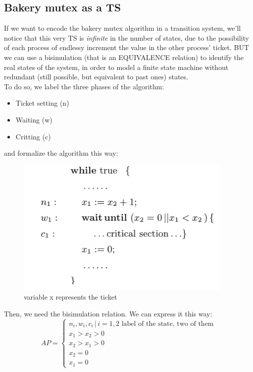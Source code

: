 \documentclass{article}
\begin{document}
			\subsection{Bakery mutex as a TS}
				If we want to encode the bakery mutex algorithm in a transition system, we'll notice that this very TS is \emph{infinite} in the number of states, due to the possibility of each process of endlessy increment the value in the other process' ticket. BUT we can use a bisimulation (that is an EQUIVALENCE relation) to identify the real states of the system, in order to model a finite state machine without redundant (still possible, but equivalent to past ones) states.\\
				To do so, we label the three phases of the algorithm:
				\begin{itemize}
					\item Ticket setting (n)
					\item Waiting (w)
					\item Critting (c)
				\end{itemize}
				and formalize the algorithm this way:
				\begin{figure}[H]
					\centering
					\includegraphics[width = \textwidth]{./images/bakery1.png}
					\caption{variable x represents the ticket}
				\end{figure}
				Then, we need the bisimulation relation. We can express it this way:
				\begin{equation}
					AP = 
					\begin{cases}
						n_i, w_i, c_i \,\vert\, i = 1, 2 \text{ label of the state, two of them}\\
						x_1 > x_2 > 0\\
						x_2 > x_1 > 0\\
						x_2 = 0\\
						x_1 = 0
					\end{cases}
				\end{equation}
\end{document}
